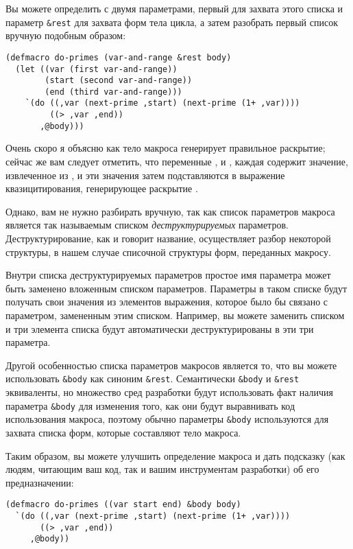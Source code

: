 Вы можете определить  с двумя параметрами, первый для захвата этого списка
и параметр \lstinline!&rest! для захвата форм тела цикла, а затем разобрать первый список
вручную подобным образом:

\begin{lstlisting}
(defmacro do-primes (var-and-range &rest body)
  (let ((var (first var-and-range))
        (start (second var-and-range))
        (end (third var-and-range)))
    `(do ((,var (next-prime ,start) (next-prime (1+ ,var))))
         ((> ,var ,end))
       ,@body)))
\end{lstlisting}

Очень скоро я объясню как тело макроса генерирует правильное раскрытие; сейчас же вам
следует отметить, что переменные ,  и , каждая содержит
значение, извлеченное из , и эти значения затем подставляются в
выражение квазицитирования, генерирующее раскрытие .

Однако, вам не нужно разбирать  вручную, так как список параметров
макроса является так называемым списком \textit{деструктурируемых}
параметров. Деструктурирование, как и говорит название, осуществляет разбор некоторой
структуры, в нашем случае списочной структуры форм, переданных макросу.

Внутри списка деструктурируемых параметров простое имя параметра может быть заменено
вложенным списком параметров. Параметры в таком списке будут получать свои значения из
элементов выражения, которое было бы связано с параметром, замененным этим
списком. Например, вы можете заменить  списком 
и три элемента списка будут автоматически деструктурированы в эти три параметра.

Другой особенностью списка параметров макросов является то, что вы можете использовать
\lstinline!&body! как синоним \lstinline!&rest!. Семантически \lstinline!&body! и
\lstinline!&rest! эквиваленты, но множество сред разработки будут использовать факт
наличия параметра \lstinline!&body! для изменения того, как они будут выравнивать код
использования макроса, поэтому обычно параметры \lstinline!&body! используются для захвата
списка форм, которые составляют тело макроса.

Таким образом, вы можете улучшить определение макроса  и дать подсказку
(как людям, читающим ваш код, так и вашим инструментам разработки) об его предназначении:

\begin{lstlisting}
(defmacro do-primes ((var start end) &body body)
  `(do ((,var (next-prime ,start) (next-prime (1+ ,var))))
       ((> ,var ,end))
     ,@body))
\end{lstlisting}

